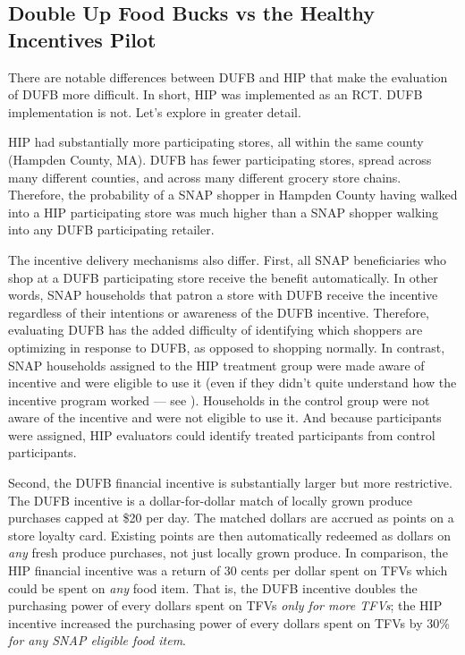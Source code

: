 \documentclass[12pt,letterpaperpaper,]{book}
\begin{document}
\subsection*{Double Up Food Bucks vs the Healthy Incentives
Pilot}\label{double-up-food-bucks-vs-the-healthy-incentives-pilot}

There are notable differences between DUFB and HIP that make the
evaluation of DUFB more difficult. In short, HIP was implemented as an
RCT. DUFB implementation is not. Let's explore in greater detail.

HIP had substantially more participating stores, all within the same
county (Hampden County, MA). DUFB has fewer participating stores, spread
across many different counties, and across many different grocery store
chains. Therefore, the probability of a SNAP shopper in Hampden County
having walked into a HIP participating store was much higher than a SNAP
shopper walking into any DUFB participating retailer.

The incentive delivery mechanisms also differ. First, all SNAP
beneficiaries who shop at a DUFB participating store receive the benefit
automatically. In other words, SNAP households that patron a store with
DUFB receive the incentive regardless of their intentions or awareness
of the DUFB incentive. Therefore, evaluating DUFB has the added
difficulty of identifying which shoppers are optimizing in response to
DUFB, as opposed to shopping normally. In contrast, SNAP households
assigned to the HIP treatment group were made aware of incentive and
were eligible to use it (even if they didn't quite understand how the
incentive program worked --- see \citet{bartlett_evaluation_2014}).
Households in the control group were not aware of the incentive and were
not eligible to use it. And because participants were assigned, HIP
evaluators could identify treated participants from control
participants.

Second, the DUFB financial incentive is substantially larger but more
restrictive. The DUFB incentive is a dollar-for-dollar match of locally
grown produce purchases capped at \$20 per day. The matched dollars are
accrued as points on a store loyalty card. Existing points are then
automatically redeemed as dollars on \emph{any} fresh produce purchases,
not just locally grown produce. In comparison, the HIP financial
incentive was a return of 30 cents per dollar spent on TFVs which could
be spent on \emph{any} food item. That is, the DUFB incentive doubles
the purchasing power of every dollars spent on TFVs \emph{only for more
TFVs}; the HIP incentive increased the purchasing power of every dollars
spent on TFVs by 30\% \emph{for any SNAP eligible food item}.
\end{document}
